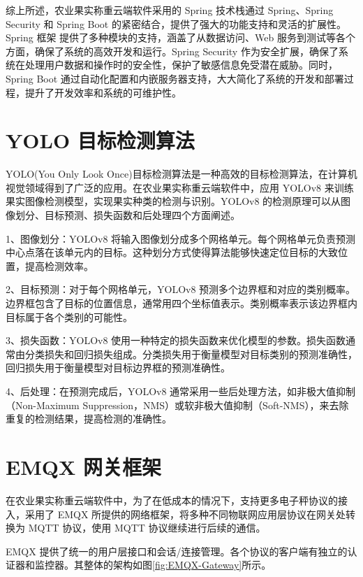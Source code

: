 综上所述，农业果实称重云端软件采用的 Spring 技术栈通过 Spring、Spring Security 和 Spring Boot 的紧密结合，提供了强大的功能支持和灵活的扩展性。Spring 框架 提供了多种模块的支持，涵盖了从数据访问、Web 服务到测试等各个方面，确保了系统的高效开发和运行。Spring Security 作为安全扩展，确保了系统在处理用户数据和操作时的安全性，保护了敏感信息免受潜在威胁。同时，Spring Boot 通过自动化配置和内嵌服务器支持，大大简化了系统的开发和部署过程，提升了开发效率和系统的可维护性。

\section{YOLO 目标检测算法}

YOLO(You Only Look Once)目标检测算法是一种高效的目标检测算法，在计算机视觉领域得到了广泛的应用\cite{Lin2019}。在农业果实称重云端软件中，应用 YOLOv8 来训练果实图像检测模型，实现果实种类的检测与识别。YOLOv8 的检测原理可以从图像划分、目标预测、损失函数和后处理四个方面阐述。

1、图像划分：YOLOv8 将输入图像划分成多个网格单元。每个网格单元负责预测中心点落在该单元内的目标。这种划分方式使得算法能够快速定位目标的大致位置，提高检测效率。

2、目标预测：对于每个网格单元，YOLOv8 预测多个边界框和对应的类别概率。边界框包含了目标的位置信息，通常用四个坐标值表示。类别概率表示该边界框内目标属于各个类别的可能性。

3、损失函数：YOLOv8 使用一种特定的损失函数来优化模型的参数。损失函数通常由分类损失和回归损失组成。分类损失用于衡量模型对目标类别的预测准确性，回归损失用于衡量模型对目标边界框的预测准确性。

4、后处理：在预测完成后，YOLOv8 通常采用一些后处理方法，如非极大值抑制（Non-Maximum Suppression，NMS）或软非极大值抑制（Soft-NMS）\cite{SuperYOLO8}，来去除重复的检测结果，提高检测的准确性。

\section{EMQX 网关框架}

在农业果实称重云端软件中，为了在低成本的情况下，支持更多电子秤协议的接入，采用了 EMQX 所提供的网络框架，将多种不同物联网应用层协议在网关处转换为 MQTT 协议，使用 MQTT 协议继续进行后续的通信。

EMQX 提供了统一的用户层接口和会话/连接管理。各个协议的客户端有独立的认证器和监控器\cite{EMQX-Gateway}。其整体的架构如图\ref{fig:EMQX-Gateway}所示。

